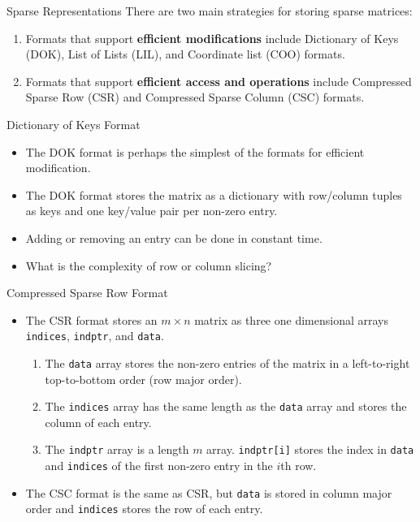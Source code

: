 \documentclass[serif,xcolor=pdftex,dvipsnames,table,hyperref={bookmarks=false,breaklinks}]{beamer}
\begin{document}
\begin{frame}[t]{Sparse Representations}
	There are two main strategies for storing sparse matrices:
	\begin{enumerate}[<+->]
		\item Formats that support \textbf{efficient modifications} include Dictionary of Keys (DOK), List of Lists (LIL), and Coordinate list (COO) formats.
		\item Formats that support \textbf{efficient access and operations} include Compressed Sparse Row (CSR) and Compressed Sparse Column (CSC) formats.
	\end{enumerate}
\end{frame}

\begin{frame}[t]{Dictionary of Keys Format}
	\begin{itemize}[<+->]
		\item The DOK format is perhaps the simplest of the formats for efficient modification. 
		\item The DOK format stores the matrix as a dictionary with row/column tuples as keys and one key/value pair per non-zero entry.
		\item Adding or removing an entry can be done in constant time. 
		\item What is the complexity of row or column slicing?
	\end{itemize}
\end{frame}

\begin{frame}[t,fragile]{Compressed Sparse Row Format}
	\begin{itemize}[<+->]
		\item The CSR format stores an $m \times n$ matrix as three one dimensional arrays \verb|indices|, \verb|indptr|, and \verb|data|.
		\begin{enumerate}[<+->]
			\item The \verb|data| array stores the non-zero entries of the matrix in a left-to-right top-to-bottom order (row major order).
			\item The \verb|indices| array has the same length as the \verb|data| array and stores the column of each entry.
			\item The \verb|indptr| array is a length $m$ array. \verb|indptr[i]| stores the index in \verb|data| and \verb|indices| of the first non-zero entry in the $i$th row.
		\end{enumerate}
		\item The CSC format is the same as CSR, but \verb|data| is stored in column major order and \verb|indices| stores the row of each entry.
	\end{itemize}
	
\end{frame}
\end{document}
